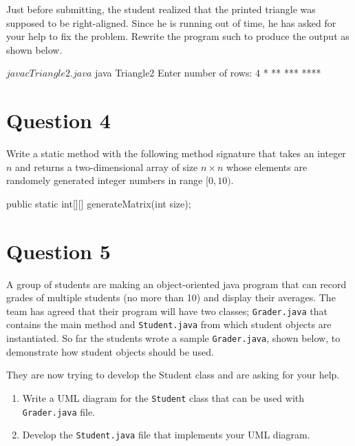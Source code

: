 \documentclass[12pt,letterpaper,twoside]{article}
\begin{document}
Just before submitting, the student realized that the printed triangle was supposed to be right-aligned.
Since he is running out of time, he has asked for your help to fix the problem.
Rewrite the program such to produce the output as shown below.

\begin{terminal}
$ javac Triangle2.java
$ java Triangle2
Enter number of rows: 4
   *
  **
 ***
****
\end{terminal}

\section*{Question 4}

Write a static method with the following method signature that takes an integer $n$ and returns a two-dimensional array of size $n \times n$ whose elements are randomely generated integer numbers in range $[0, 10)$.

\begin{terminal}
public static int[][] generateMatrix(int size);
\end{terminal}

\section*{Question 5}

A group of students are making an object-oriented java program that can record grades of multiple students (no more than 10) and display their averages.
The team has agreed that their program will have two classes; \texttt{Grader.java} that contains the main method and \texttt{Student.java} from which student objects are instantiated.
So far the students wrote a sample \texttt{Grader.java}, shown below, to demonstrate how student objects should be used.



They are now trying to develop the Student class and are asking for your help.

\begin{enumerate}
	\item Write a UML diagram for the \texttt{Student} class that can be used with \texttt{Grader.java} file.
	\item Develop the \texttt{Student.java} file that implements your UML diagram.
\end{enumerate}

\newpage
\end{document}
